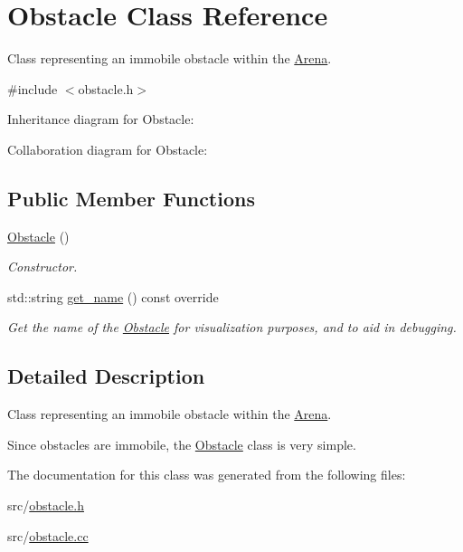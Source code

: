 \hypertarget{classObstacle}{}\section{Obstacle Class Reference}
\label{classObstacle}


Class representing an immobile obstacle within the \hyperlink{classArena}{Arena}.  




{\ttfamily \#include $<$obstacle.\+h$>$}



Inheritance diagram for Obstacle\+:


Collaboration diagram for Obstacle\+:
\subsection*{Public Member Functions}
\begin{DoxyCompactItemize}
\item 
\hyperlink{classObstacle_a8f734072321fa06a7b7dae2d5f50f352}{Obstacle} ()\hypertarget{classObstacle_a8f734072321fa06a7b7dae2d5f50f352}{}\label{classObstacle_a8f734072321fa06a7b7dae2d5f50f352}

\begin{DoxyCompactList}\small\item\em Constructor. \end{DoxyCompactList}\item 
std\+::string \hyperlink{classObstacle_a4642d3f61b6e74fd5a9c91bb263dfe18}{get\+\_\+name} () const override\hypertarget{classObstacle_a4642d3f61b6e74fd5a9c91bb263dfe18}{}\label{classObstacle_a4642d3f61b6e74fd5a9c91bb263dfe18}

\begin{DoxyCompactList}\small\item\em Get the name of the \hyperlink{classObstacle}{Obstacle} for visualization purposes, and to aid in debugging. \end{DoxyCompactList}\end{DoxyCompactItemize}


\subsection{Detailed Description}
Class representing an immobile obstacle within the \hyperlink{classArena}{Arena}. 

Since obstacles are immobile, the \hyperlink{classObstacle}{Obstacle} class is very simple. 

The documentation for this class was generated from the following files\+:\begin{DoxyCompactItemize}
\item 
src/\hyperlink{obstacle_8h}{obstacle.\+h}\item 
src/\hyperlink{obstacle_8cc}{obstacle.\+cc}\end{DoxyCompactItemize}

